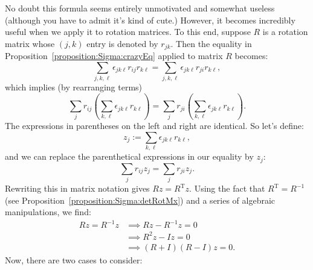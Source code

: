 No doubt this formula seems entirely unmotivated and somewhat useless (although you have to admit it's kind of cute.)  However, it becomes incredibly useful when we apply it to rotation matrices. To this end, suppose $R$ is a rotation matrix whose $(j,k)$ entry is denoted by $r_{jk}$. 
Then the equality in Proposition~\ref{proposition:Sigma:crazyEq} applied to matrix $R$  becomes:
\[ \sum_{j,k,\ell}\epsilon_{jk\ell} r_{ij}r_{k\ell} =  \sum_{j,k,\ell}\epsilon_{jk\ell} r_{ji}r_{k\ell}, \]
which implies (by rearranging terms)
\[ \sum_{j}r_{ij} \left( \sum_{k,\ell} \epsilon_{jk\ell} r_{k\ell} \right) 
=  \sum_{j}r_{ji} \left( \sum_{k,\ell} \epsilon_{jk\ell} r_{k\ell} \right). \]
The expressions in parentheses on the left and right are identical. So let's define:
\[ z_j :=  \sum_{k,\ell}\epsilon_{jk\ell} r_{k\ell}, \]
and we can replace the parenthetical expressions in our equality by $z_j$:
\[ \sum_{j}r_{ij} z_j=  \sum_{j}r_{ji} z_j. \]
Rewriting this in matrix notation gives $Rz = R^{\text{T}}z$. Using the fact that $R^{\text{T}} = R^{-1}$ (see Proposition~\ref{proposition:Sigma:detRotMx}) and a series of algebraic manipulations,  we find:
\begin{align*}
 Rz = R^{-1}z &\implies  Rz - R^{-1}z = 0 \\
&\implies R^2z - Iz = 0\\
& \implies  (R + I)(R-I)z = 0.
\end{align*}
Now, there are two cases to consider:
